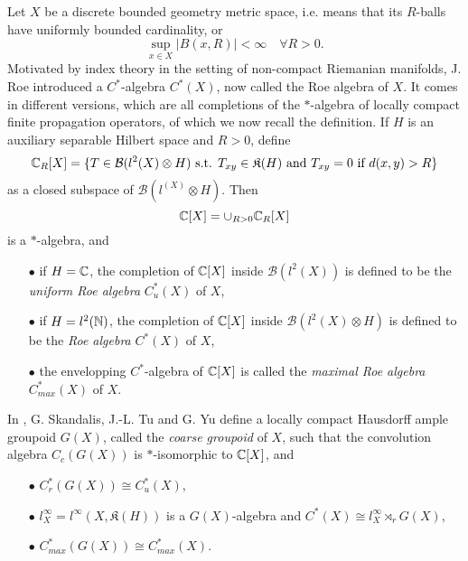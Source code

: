 

Let $X$ be a discrete bounded geometry metric space, i.e. means that its $R$-balls have uniformly bounded cardinality, or
\[\sup_{x\in X} |B(x,R)| < \infty \quad \forall R>0.\]
Motivated by index theory in the setting of non-compact Riemanian manifolds, J. Roe introduced a $C^*$-algebra $C^*(X)$, now called the Roe algebra of $X$. It comes in different versions, which are all completions of the $*$-algebra of locally compact finite propagation operators, of which we now recall the definition. If $H$ is an auxiliary separable Hilbert space and $R>0$, define 
\[ \mathbb C_R[X] = \{T\in\mathcal B(l^2(X)\otimes H)\text{ s.t. } T_{xy}\in \mathfrak K(H) \text{ and } T_{xy} = 0 \text{ if } d(x,y)>R \} \]
as a closed subspace of $\mathcal B(l^(X)\otimes H)$. Then 
\[\mathbb C[X] = \cup_{R>0} \mathbb C_R[X]\]
is a $*$-algebra, and
\begin{itemize}
\item[$\bullet$] if $H=\mathbb C$, the completion of $\mathbb C[X]$ inside $\mathcal B(l^2(X))$ is defined to be the \textit{uniform Roe algebra} $C_u^*(X)$ of $X$,
\item[$\bullet$] if $H=l^2(\mathbb N)$, the completion of $\mathbb C[X]$ inside $\mathcal B(l^2(X)\otimes H)$ is defined to be the \textit{Roe algebra} $C^*(X)$  of $X$,
\item[$\bullet$] the envelopping $C^*$-algebra of $\mathbb C[X]$ is called the \textit{maximal Roe algebra} $C_{max}^*(X)$  of $X$.
\end{itemize}
In \cite{SkTuYu}, G. Skandalis, J.-L. Tu and G. Yu define a locally compact Hausdorff ample groupoid $G(X)$, called the \textit{coarse groupoid} of $X$, such that the convolution algebra $C_c(G(X))$ is $*$-isomorphic to $\mathbb C[X]$, and 
\begin{itemize}
\item[$\bullet$] $C^*_r(G(X)) \cong C_u^*(X)$,
\item[$\bullet$] $l^\infty_X=l^\infty(X, \mathfrak K(H))$ is a $G(X)$-algebra and $C^*(X)\cong l^\infty_X \rtimes_r G(X)$,
\item[$\bullet$] $C_{max}^*(G(X)) \cong C_{max}^*(X)$.
\end{itemize}

